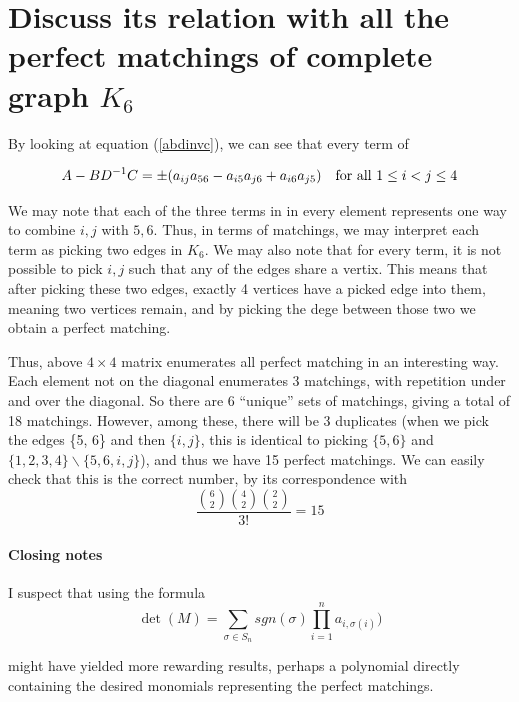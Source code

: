 \documentclass{article}
\renewcommand{\a}[1]{a_{#1}}
\begin{document}
\section{Discuss its relation with all the perfect matchings of complete graph $K_6$}

By looking at equation (\ref{abdinvc}), we can see that every term of

$$
A - BD^{-1}C = \pm(\a{ij}\a{56} - \a{i5}\a{j6} + \a{i6}\a{j5}) \text{\quad for
  all } 1 \leq i < j \leq 4
$$

We may note that each of the three terms in in every element represents one way
to combine $i, j$ with $5,6$. Thus, in terms of matchings, we may interpret each
term as picking two edges in $K_6$. We may also note that for every term, it is
not possible to pick $i,j$ such that any of the edges share a vertix. This means
that after picking these two edges, exactly 4 vertices have a picked edge into
them, meaning two vertices remain, and by picking the dege between those two we
obtain a perfect matching. 

Thus, above $4\times4$ matrix enumerates all perfect matching in an interesting
way. Each element not on the diagonal enumerates 3 matchings, with repetition
under and over the diagonal. So there are $6$ ``unique'' sets of matchings,
giving a total of 18 matchings. However, among these, there will be 3
duplicates (when we pick the edges \{5, 6\} and then $\{i, j\}$, this is
identical to picking $\{5, 6\}$ and $\{1, 2, 3, 4\} \backslash \{5,6, i, j\}$),
and thus we have 15 perfect matchings. We can easily check that this is the
correct number, by its correspondence with
$$\frac{\binom{6}{2}\binom{4}{2}\binom{2}{2}}{3!} = 15$$

\paragraph{Closing notes} I suspect that using the formula
$$\det(M) = \sum_{\sigma \in S_n}sgn(\sigma)\prod_{i=1}^na_{i,\sigma(i)})$$

\noindent might have yielded more rewarding results, perhaps a polynomial
directly containing the desired monomials representing the perfect matchings.


% 
\end{document}

